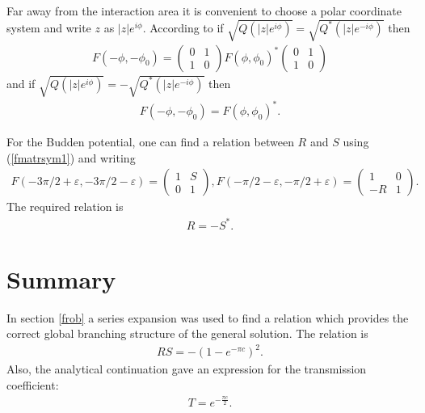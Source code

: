 \documentclass[aps,prl,preprint,superscriptaddress]{revtex4}
\begin{document}
Far away from the interaction area it is convenient to choose a polar coordinate system and write $z$ as $|z| e^{i \phi}$.
According to \cite{symm} if \mbox{$\sqrt{Q(|z|e^{i \phi})}=\sqrt{Q^*(|z|e^{-i \phi})}$} then
\begin{eqnarray}
F(-\phi,-\phi_0)=
\left( \begin{array}{cc} 0 & 1 \\ 1 & 0 \end{array} \right)
F(\phi,\phi_0)^*
\left( \begin{array}{cc} 0 & 1 \\ 1 & 0 \end{array} \right)
    \label{fmatrsym1}
\end{eqnarray}
and if \mbox{$\sqrt{Q(|z|e^{i \phi})}=-\sqrt{Q^*(|z|e^{-i \phi})}$} then 
\begin{eqnarray}
F(-\phi,-\phi_0)=F(\phi,\phi_0)^*.
    \label{fmatrsym2}
\end{eqnarray}

For the Budden potential, one can find a relation between $R$ and $S$ using (\ref{fmatrsym1}) and writing
\begin{eqnarray}
F(-3\pi/2+\varepsilon,-3\pi/2-\varepsilon)=\left( \begin{array}{cc} 1 & S \\ 0 & 1 \end{array} \right), 
F(-\pi/2-\varepsilon,-\pi/2+\varepsilon)=\left( \begin{array}{cc} 1 & 0 \\ -R & 1 \end{array} \right).
\end{eqnarray}
The required relation is
\begin{eqnarray}
R=-S^*.    \label{desiredrel}
\end{eqnarray}

\section{Summary \label{summury}}

In section \ref{frob} a series expansion was used to find a relation which provides the correct global branching structure of the general solution. The relation is
\begin{eqnarray}
RS=-(1-e^{-\pi c})^2.  
\end{eqnarray}
Also, the analytical continuation gave an expression for the transmission coefficient:
\begin{eqnarray}
T=e^{-\frac{\pi c}{2}}.
\end{eqnarray}
\end{document}

